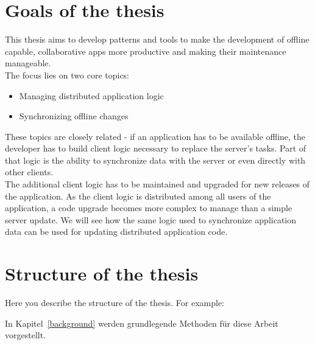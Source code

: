 \section{Goals of the thesis}
This thesis aims to develop patterns and tools to make the development of offline capable, collaborative apps more productive and making their maintenance manageable.\\
The focus lies on two core topics:
\begin{itemize}
\item Managing distributed application logic
\item Synchronizing offline changes
\end{itemize}

These topics are closely related - if an application has to be available offline, the developer has to build client logic necessary to replace the server's tasks. Part of that logic is the ability to synchronize data with the server or even directly with other clients.\\
The additional client logic has to be maintained and upgraded for new releases of the application. As the client logic is distributed among all users of the application, a code upgrade becomes more complex to manage than a simple server update. We will see how the same logic used to synchronize application data can be used for updating distributed application code.

\section{Structure of the thesis}
Here you describe the structure of the thesis. For example:

In Kapitel~\ref{background} werden grundlegende Methoden für diese Arbeit vorgestellt.